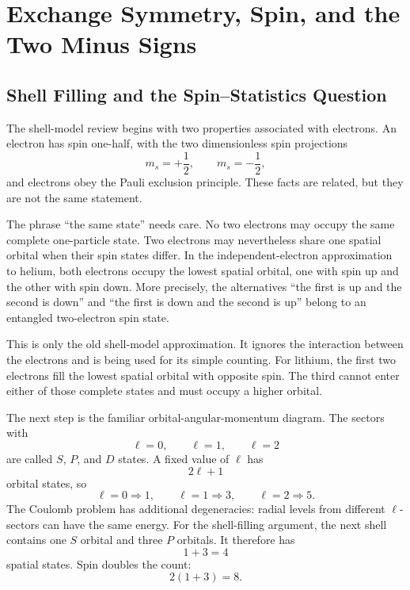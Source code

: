 \chapter{Exchange Symmetry, Spin, and the Two Minus Signs}

\section{Shell Filling and the Spin--Statistics Question}

The shell-model review begins with two properties associated with electrons. An electron has spin one-half, with the two dimensionless spin projections
\begin{equation}
m_s=+\frac12,
\qquad
m_s=-\frac12,
\end{equation}
and electrons obey the Pauli exclusion principle. These facts are related, but they are not the same statement.

The phrase ``the same state'' needs care. No two electrons may occupy the same complete one-particle state. Two electrons may nevertheless share one spatial orbital when their spin states differ. In the independent-electron approximation to helium, both electrons occupy the lowest spatial orbital, one with spin up and the other with spin down. More precisely, the alternatives ``the first is up and the second is down'' and ``the first is down and the second is up'' belong to an entangled two-electron spin state.

This is only the old shell-model approximation. It ignores the interaction between the electrons and is being used for its simple counting. For lithium, the first two electrons fill the lowest spatial orbital with opposite spin. The third cannot enter either of those complete states and must occupy a higher orbital.

The next step is the familiar orbital-angular-momentum diagram. The sectors with
\begin{equation}
\ell=0,\qquad \ell=1,\qquad \ell=2
\end{equation}
are called \(S\), \(P\), and \(D\) states. A fixed value of \(\ell\) has
\begin{equation}
2\ell+1
\end{equation}
orbital states, so
\begin{equation}
\ell=0\Rightarrow 1,
\qquad
\ell=1\Rightarrow 3,
\qquad
\ell=2\Rightarrow 5.
\end{equation}
The Coulomb problem has additional degeneracies: radial levels from different \(\ell\)-sectors can have the same energy. For the shell-filling argument, the next shell contains one \(S\) orbital and three \(P\) orbitals. It therefore has
\begin{equation}
1+3=4
\end{equation}
spatial states. Spin doubles the count:
\begin{equation}
2(1+3)=8.
\end{equation}

